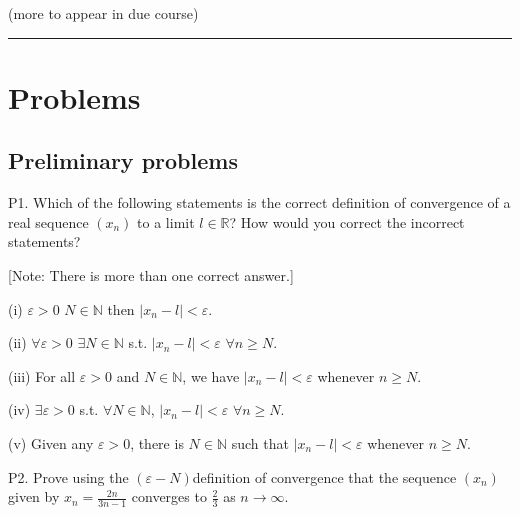 \documentclass[letterpaper,10pt,english]{jupyterBook}
\begin{document}
\sphinxAtStartPar
{\hyperref[\detokenize{Solutions-full:sol}]{}} (more to appear in due course) 
  {\hyperref[\detokenize{Solutions-full:ch1sol}]{}} 
  {\hyperref[\detokenize{Solutions-full:ch2sol}]{}} 




\bigskip\hrule\bigskip


\sphinxstepscope


\section{Problems}
\label{\detokenize{Problems:problems}}\label{\detokenize{Problems:prob}}\label{\detokenize{Problems::doc}}

\subsection{Preliminary problems}
\label{\detokenize{Problems:preliminary-problems}}\label{\detokenize{Problems:ch1prob}}\label{\detokenize{Problems:p1}}
\sphinxAtStartPar
P1.
Which of the following statements is the correct definition of convergence of a real sequence \((x_n)\) to a limit \(l\in\mathbb{R}\)? How would you correct the incorrect statements?

{[}Note: There is more than one correct answer.{]}

\sphinxAtStartPar
(i) \(\varepsilon>0\) \(N\in\mathbb{N}\) then \(|x_n-l|<\varepsilon\).

\sphinxAtStartPar
(ii) \(\forall\varepsilon>0\) \(\exists N\in\mathbb{N}\) s.t.  \(|x_n-l|<\varepsilon\) \(\forall n\geq N\).

\sphinxAtStartPar
(iii) For all \(\varepsilon>0\) and \(N\in\mathbb{N}\), we have \(|x_n-l|<\varepsilon\) whenever \(n\geq N\).

\sphinxAtStartPar
(iv) \(\exists\varepsilon>0\) s.t. \(\forall N\in\mathbb{N}\), \(|x_n-l|<\varepsilon\) \(\forall n\geq N\).

\sphinxAtStartPar
(v) Given any \(\varepsilon>0\), there is \(N\in\mathbb{N}\) such that \(|x_n-l|<\varepsilon\) whenever \(n\geq N\).


\label{\detokenize{Problems:p2}}
\sphinxAtStartPar
P2.  Prove using the \((\varepsilon-N)\)\sphinxhyphen{}definition of convergence that the sequence \((x_n)\) given by \(x_n = \frac{2n}{3n-1}\) converges to \(\frac{2}{3}\) as \(n\rightarrow\infty\).
\end{document}
